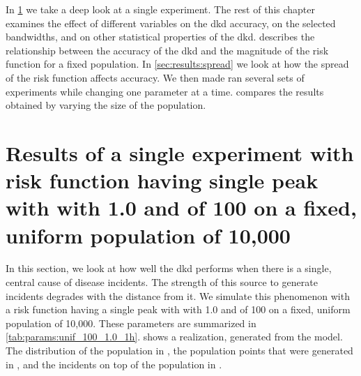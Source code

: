 In \cref{sec:results:unif_100_1.0_1h} we take a deep look at a single experiment.
The rest of this chapter examines the effect of different variables on the \gls{dkd} accuracy, on the selected bandwidths, and on other statistical properties of the \gls{dkd}.
 describes the relationship between the accuracy of the \gls{dkd} and the magnitude of the risk function for a fixed population.
In \cref{sec:results:spread} we look at how the spread of the risk function affects accuracy.
We then made ran several sets of experiments while changing one parameter at a time.
 compares the results obtained by varying the size of the population.

\section[Results of single-peak risk on uniform population]
    {Results of a single experiment with risk function having single peak with with  1.0 and  of 100 on a fixed, uniform population of 10,000}
\label{sec:results:unif_100_1.0_1h}
\graphicspath{{./results/unif_100_1.0_1h/}}
\makeatletter
{}
\makeatother

In this section, we look at how well the \gls{dkd} performs when there is a single, central cause of disease incidents.
The strength of this source to generate incidents degrades with the distance from it.
We simulate this phenomenon with a risk function having a single peak with with  1.0 and  of 100 on a fixed, uniform population of 10,000.
These parameters are summarized in \cref{tab:params:unif_100_1.0_1h}.
 shows a realization, generated from the model.
The distribution of the population in ,
the population points that were generated in ,
and the incidents on top of the population in .

